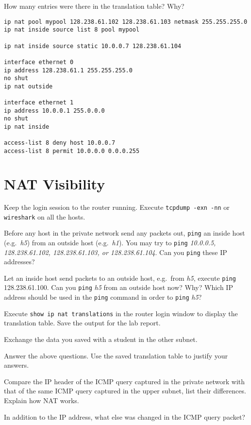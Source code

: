 \documentclass{../UTNetLab}
\begin{document}
    \begin{report}
    \item How many entries were there in the translation table? Why?
    \end{report}
    
    \begin{lstlisting}[language={cisco}, caption={NAT Router Configuration in Fig. 8.7}]
ip nat pool mypool 128.238.61.102 128.238.61.103 netmask 255.255.255.0
ip nat inside source list 8 pool mypool

ip nat inside source static 10.0.0.7 128.238.61.104

interface ethernet 0
ip address 128.238.61.1 255.255.255.0
no shut
ip nat outside

interface ethernet 1
ip address 10.0.0.1 255.0.0.0
no shut
ip nat inside

access-list 8 deny host 10.0.0.7
access-list 8 permit 10.0.0.0 0.0.0.255
    \end{lstlisting}

\section{NAT Visibility}
    Keep the login session to the router running. Execute \lstinline{tcpdump -exn -nn} or \lstinline{wireshark} on all the hosts. 

    Before any host in the private network send any packets out, \lstinline{ping} an inside host (e.g.\ \textit{h5}) from an outside host (e.g.\ \textit{h1}). You may try to \lstinline{ping} \textit{10.0.0.5, 128.238.61.102, 128.238.61.103, or 128.238.61.104}. Can you \lstinline{ping} these IP addresses? 

    Let an inside host send packets to an outside host, e.g.\ from \textit{h5}, execute \lstinline{ping} 128.238.61.100. Can you \lstinline{ping} \textit{h5} from an outside host now? Why? Which IP address should be used in the \lstinline{ping} command in order to \lstinline{ping} \textit{h5}? 

    Execute \lstinline[language=cisco]{show ip nat translations} in the router login window to display the translation table. Save the output for the lab report. 

    Exchange the data you saved with a student in the other subnet.

    \begin{report}
    \item Answer the above questions.
    Use the saved translation table to justify your answers.
    
    \item Compare the IP header of the ICMP query captured in the private network with that of the same ICMP query captured in the upper subnet, list their differences.
    Explain how NAT works.
    
    \item In addition to the IP address, what else was changed in the ICMP query packet?
    \end{report}
\end{document}
